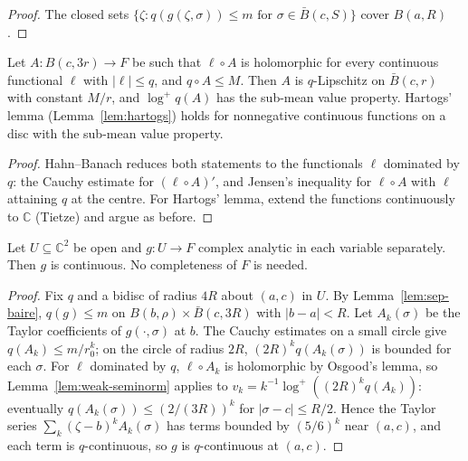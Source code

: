 \begin{proof}
  \leanok
  The closed sets $\{\zeta : q(g(\zeta, \sigma)) \le m \text{ for } \sigma \in \bar B(c, S)\}$
  cover $B(a, R)$.
\end{proof}

\begin{lemma}
  \label{lem:weak-seminorm}
  \leanok
  Let $A \colon B(c, 3r) \to F$ be such that $\ell \circ A$ is holomorphic for every continuous
  functional $\ell$ with $|\ell| \le q$, and $q \circ A \le M$. Then $A$ is $q$-Lipschitz on
  $\bar B(c, r)$ with constant $M/r$, and $\log^+ q(A)$ has the sub-mean value property. Hartogs'
  lemma (Lemma~\ref{lem:hartogs}) holds for nonnegative continuous functions on a disc with the
  sub-mean value property.
\end{lemma}

\begin{proof}
  \leanok
  Hahn--Banach reduces both statements to the functionals $\ell$ dominated by $q$: the Cauchy
  estimate for $(\ell \circ A)'$, and Jensen's inequality for $\ell \circ A$ with $\ell$
  attaining $q$ at the centre. For Hartogs' lemma, extend the functions continuously to
  $\mathbb{C}$ (Tietze) and argue as before.
\end{proof}

\begin{theorem}
  \label{thm:hartogs-separate}
  \leanok
  Let $U \subseteq \mathbb{C}^2$ be open and $g \colon U \to F$ complex analytic in each variable
  separately. Then $g$ is continuous. No completeness of $F$ is needed.
\end{theorem}

\begin{proof}
  \leanok
  Fix $q$ and a bidisc of radius $4R$ about $(a, c)$ in $U$. By Lemma~\ref{lem:sep-baire},
  $q(g) \le m$ on $B(b, \rho) \times \bar B(c, 3R)$ with $|b - a| < R$. Let $A_k(\sigma)$ be the
  Taylor coefficients of $g(\cdot, \sigma)$ at $b$. The Cauchy estimates on a small circle give
  $q(A_k) \le m/r_0^k$; on the circle of radius $2R$, $(2R)^k q(A_k(\sigma)) $ is bounded for each
  $\sigma$. For $\ell$ dominated by $q$, $\ell \circ A_k$ is holomorphic by Osgood's lemma, so
  Lemma~\ref{lem:weak-seminorm} applies to $v_k = k^{-1} \log^+((2R)^k q(A_k))$: eventually
  $q(A_k(\sigma)) \le (2/(3R))^k$ for $|\sigma - c| \le R/2$. Hence the Taylor series
  $\sum_k (\zeta - b)^k A_k(\sigma)$ has terms bounded by $(5/6)^k$ near $(a, c)$, and each term
  is $q$-continuous, so $g$ is $q$-continuous at $(a, c)$.
\end{proof}

